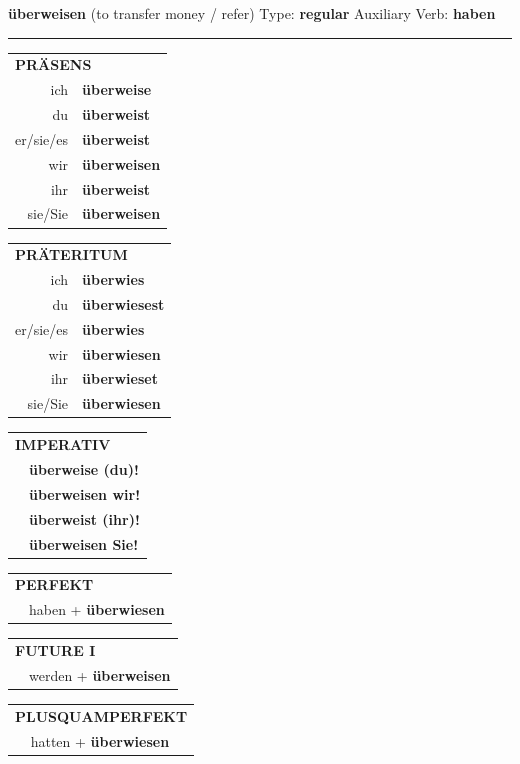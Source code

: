 \documentclass[10pt,a4paper]{revtex4-2}
\begin{document}
\begin{verbbox}
{\Large \bf überweisen} (to transfer money / refer) \hfill Type: \textbf{regular} \hfill Auxiliary Verb: \textbf{haben}

\vspace{5pt}
\hrule
\vspace{5pt}

\begin{tabular}{rl}
\multicolumn{2}{l}{\textbf{PRÄSENS}}\\
ich & \textbf{überweise}\\
du & \textbf{überweist}\\
er/sie/es & \textbf{überweist}\\
wir & \textbf{überweisen}\\
ihr & \textbf{überweist}\\
sie/Sie & \textbf{überweisen}\\
\end{tabular}
\hfill
\begin{tabular}{rl}
\multicolumn{2}{l}{\textbf{PRÄTERITUM}}\\
ich & \textbf{überwies}\\
du & \textbf{überwiesest}\\
er/sie/es & \textbf{überwies}\\
wir & \textbf{überwiesen}\\
ihr & \textbf{überwieset}\\
sie/Sie & \textbf{überwiesen}\\
\end{tabular}
\hfill
\begin{tabular}{rl}
\multicolumn{2}{l}{\textbf{IMPERATIV}}\\
& \textbf{überweise (du)!}\\
& \textbf{überweisen wir!}\\
& \textbf{überweist (ihr)!}\\
& \textbf{überweisen Sie!}\\
\end{tabular}

\vspace{10pt}

\begin{tabular}{rl}
\multicolumn{2}{l}{\textbf{PERFEKT}}\\
& haben + \textbf{überwiesen}\\
\end{tabular}
\hfill
\begin{tabular}{rl}
\multicolumn{2}{l}{\textbf{FUTURE I}}\\
& werden + \textbf{überweisen}\\
\end{tabular}
\hfill
\begin{tabular}{rl}
\multicolumn{2}{l}{\textbf{PLUSQUAMPERFEKT}}\\
& hatten + \textbf{überwiesen}\\
\end{tabular}


\end{verbbox}
\end{document}
